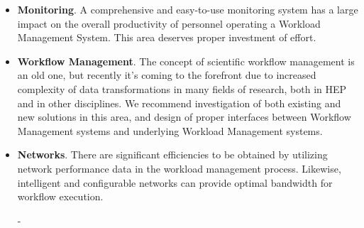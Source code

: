 \begin{itemize}

\item \textbf{Monitoring}. A comprehensive and easy-to-use monitoring system has a large impact on the overall productivity of personnel operating a Workload Management System. This area deserves proper
investment of effort.

\item \textbf{Workflow Management}. The concept of scientific workflow management is an old one, but recently it's coming to the forefront due to increased complexity
of data transformations in many fields of research, both in HEP and in other disciplines. We recommend investigation of both existing and new solutions in this area,
and design of proper interfaces between Workflow Management systems and underlying Workload Management systems.

\item \textbf{Networks}. There are significant efficiencies to be obtained by utilizing network performance data in the workload management process. Likewise,
intelligent and configurable networks can provide optimal bandwidth for workflow execution.

-

\end{itemize}


